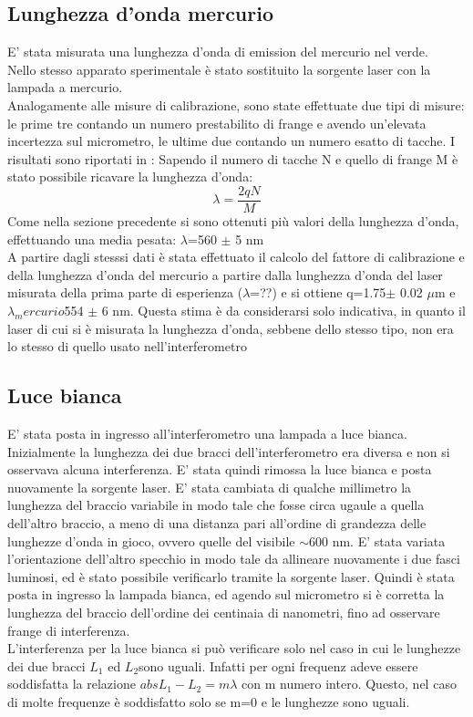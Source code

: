 \subsection{Lunghezza d'onda mercurio}
E' stata misurata una lunghezza d'onda di emission del mercurio nel verde.\\ Nello stesso apparato sperimentale è stato sostituito la sorgente laser con la lampada a mercurio.\\
Analogamente alle misure di calibrazione, sono state effettuate due tipi di misure: le prime tre contando un numero prestabilito di frange e avendo un'elevata incertezza sul micrometro, le ultime due contando un numero esatto di tacche. I risultati sono riportati in :
Sapendo il numero di tacche N e quello di frange M è stato possibile ricavare la lunghezza d'onda:
\begin{equation}
\lambda = \frac{2qN}{M}
\end{equation}
Come nella sezione precedente si sono ottenuti più valori della lunghezza d'onda, effettuando una media pesata: $\lambda$=560 $\pm$ 5 nm\\
A partire dagli stesssi dati è stata effettuato il calcolo del fattore di calibrazione e della lunghezza d'onda del mercurio a partire dalla lunghezza d'onda del laser misurata della prima parte di esperienza ($\lambda$=??) e si ottiene q=1.75$\pm$ 0.02 $\mu$m e $\lambda_mercurio$554 $\pm$ 6 nm. Questa stima è da considerarsi solo indicativa, in quanto il laser di cui si è misurata la lunghezza d'onda, sebbene dello stesso tipo, non era lo stesso di quello usato nell'interferometro
\subsection{Luce bianca}
E' stata posta in ingresso all'interferometro una lampada a luce bianca.\\
Inizialmente la lunghezza dei due bracci dell'interferometro era diversa e non si osservava alcuna interferenza. E' stata quindi rimossa la luce bianca e posta nuovamente la sorgente laser. E' stata cambiata di qualche millimetro la lunghezza del braccio variabile in modo tale che fosse circa ugaule a quella dell'altro braccio, a meno di una distanza pari all'ordine di grandezza delle lunghezze d'onda in gioco, ovvero quelle del visibile $\sim$600 nm. E' stata variata l'orientazione dell'altro specchio in modo tale da allineare nuovamente i due fasci luminosi, ed è stato possibile verificarlo tramite la sorgente laser. Quindi è stata posta in ingresso la lampada bianca, ed agendo sul micrometro si è corretta la lunghezza del braccio dell'ordine dei centinaia di nanometri, fino ad osservare frange di interferenza.\\
L'interferenza per la luce bianca si può verificare solo nel caso in cui le lunghezze dei due bracci $L_1$ ed $L_2$sono uguali. Infatti per ogni frequenz adeve essere soddisfatta la relazione $abs{L_1-L_2}=m\lambda$ con m numero intero. Questo, nel caso di molte frequenze è soddisfatto solo se m=0 e le lunghezze sono uguali.\\
